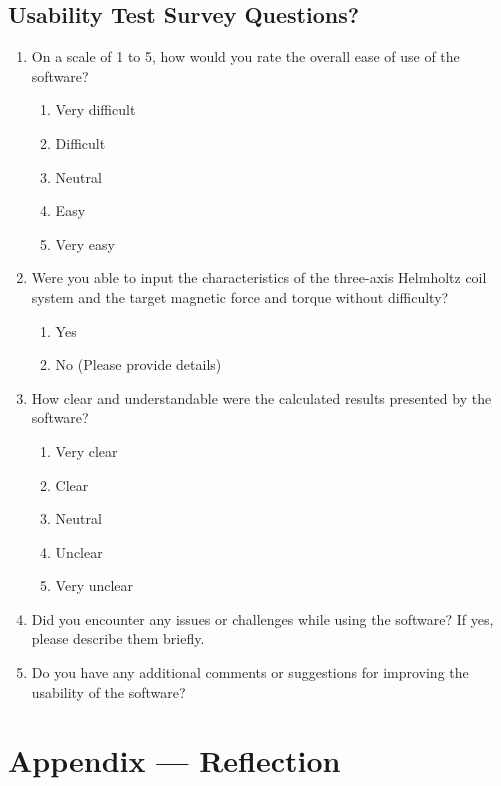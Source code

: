 \documentclass[12pt, titlepage]{article}
\begin{document}
\subsection{Usability Test Survey Questions?}\label{subsec:UsabilitySurvery}
\begin{enumerate}
    \item On a scale of 1 to 5, how would you rate the overall ease of use of the software?
    \begin{enumerate}
        \item Very difficult
        \item Difficult
        \item Neutral
        \item Easy
        \item Very easy
    \end{enumerate}

    \item Were you able to input the characteristics of the three-axis Helmholtz coil system and the target magnetic force and torque without difficulty?
    \begin{enumerate}
        \item Yes
        \item No (Please provide details)
    \end{enumerate}

    \item How clear and understandable were the calculated results presented by the software?
    \begin{enumerate}
        \item Very clear
        \item Clear
        \item Neutral
        \item Unclear
        \item Very unclear
    \end{enumerate}

    \item Did you encounter any issues or challenges while using the software? If yes, please describe them briefly.
    \item Do you have any additional comments or suggestions for improving the usability of the software?

\end{enumerate}


\newpage{}
\section*{Appendix --- Reflection}
\end{document}
